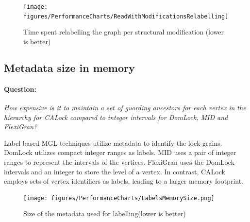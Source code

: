 \begin{figure}[ht]
	\captionsetup{justification=centering}
	\centering
		\texttt{[image: figures/PerformanceCharts/ReadWithModificationsRelabelling]}
	\caption{Time spent relabelling the graph per structural modification (lower is better)}
	\label{relabellingTime}
\end{figure}


\subsection{Metadata size in memory} \label{benchmark:metadatasize}

\paragraph{Question:} \emph{How expensive is it to maintain a set of guarding ancestors for each vertex in the hierarchy for CALock compared to integer intervals for DomLock, MID and FlexiGran?}

Label-based MGL techniques utilize metadata to identify the lock grains.
DomLock utilizes compact integer ranges as labels. 
MID uses a pair of integer ranges to represent the intervals of the vertices.
FlexiGran uses the DomLock intervals and an integer to store the level of a vertex.
In contrast, CALock employs sets of vertex identifiers as labels, leading to a larger memory footprint.

\begin{figure}
	\centering
	\captionsetup{justification=centering}
	\texttt{[image: figures/PerformanceCharts/LabelsMemorySize.png]}
 	\caption{Size of the metadata used for labelling(lower is better)}
	\label{metadataSize}
\end{figure}

